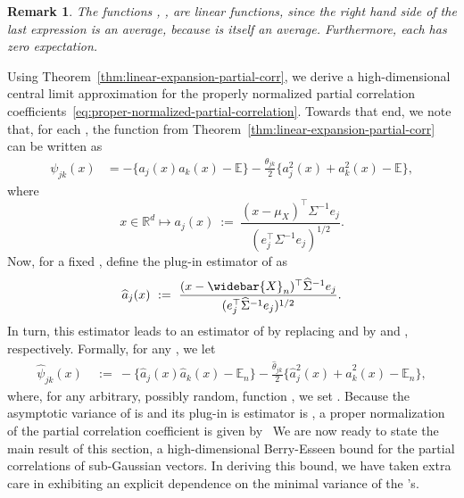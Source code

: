 \documentclass{article}
\newtheorem{remark}{Remark}
\begin{document}
\begin{remark}
The functions  ,  , are linear functions, since the right hand side of the last expression is an average, because   is itself an average.
Furthermore, each
  has zero expectation.
\end{remark}
Using Theorem~\ref{thm:linear-expansion-partial-corr}, we derive a high-dimensional central limit approximation
for the properly normalized partial correlation coefficients~\eqref{eq:proper-normalized-partial-correlation}. Towards that end, we note that, for each  , the function
  from Theorem~\ref{thm:linear-expansion-partial-corr} can be written as
\begin{equation}\label{eq:def-psi-jk}
\begin{split}
\psi_{jk}(x) &= -\bigg\{a_j(x)a_k(x) - \mathbb{E}\bigg\}
- \frac{\theta_{jk}}{2}\bigg\{a_j^2(x) + a_k^2(x) - \mathbb{E}\bigg\},
\end{split}
\end{equation}
where
\begin{equation}\label{eq:ajx-function}
x \in \mathbb{R}^d \mapsto a_j(x) ~:=~ \frac{(x - \mu_X)^{\top}\Sigma^{-1}e_j}{(e_j^{\top}\Sigma^{-1}e_j)^{1/2}}.
\end{equation}
Now, for a fixed  , define the plug-in estimator of   as
\begin{equation}\label{eq:ajhatx-function}
\widehat{a}_j(x) ~:=~ \frac{(x - \widebar{X}_n)^{\top}\widehat{\Sigma}^{-1}e_j}{(e_j^{\top}\widehat{\Sigma}^{-1}e_j)^{1/2}}.
\end{equation}
In turn, this estimator leads to an estimator   of   by replacing   and   by   and  , respectively.
Formally, for any  , we let
\begin{equation}\label{eq:def-widehat-psi-jk}
\begin{split}
\widehat{\psi}_{jk}(x) ~&:=~ -\bigg\{\widehat{a}_j(x)\widehat{a}_k(x) - \mathbb{E}_n\bigg\}
- \frac{\widehat{\theta}_{jk}}{2}\bigg\{\widehat{a}_j^2(x) + \widehat{a}_k^2(x) - \mathbb{E}_n\bigg\},
\end{split}
\end{equation}
where, for any arbitrary, possibly random, function  ,
we set  . Because the asymptotic variance of   is   and its plug-in is estimator is  , a proper normalization of the partial correlation coefficient is given by
\ We are now ready to state the main result of this section, a high-dimensional
Berry-Esseen bound for the partial correlations of sub-Gaussian vectors. In deriving this bound, we have taken extra care in exhibiting an explicit dependence on the minimal variance of the  's.
\end{document}
